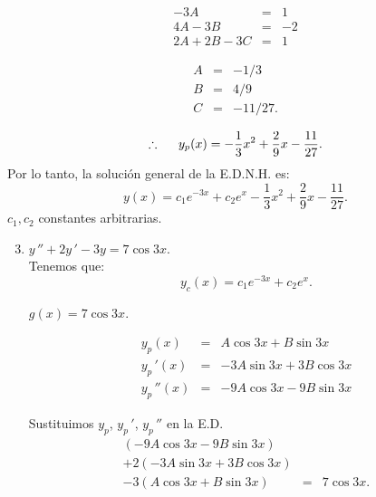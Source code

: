 \documentclass[9pt]{beamer}
\begin{document}
\begin{frame}[t]
	\begin{exampleblock}{}
		\begin{minipage}{0.5\linewidth}
			\[
				\begin{array}{rcl}
					-3A & = & 1 \\[2mm]
					4A -3B & = & -2 \\[2mm]
					2A+2B-3C & = & 1
				\end{array}
			\]
		\end{minipage}
		\begin{minipage}{0.4\linewidth}
			\[
				\begin{array}{rcl}
					A & = & -1/3 \\[2mm]
					B & = & 4/9 \\[2mm]
					C & = & -11/27.
				\end{array}
			\]
		\end{minipage}
		\[
			\therefore \hspace{5mm} y_p(x) = - \dfrac{1}{3} x^2+ \dfrac{2}{9} x- \dfrac{11}{27}.
		\]
		Por lo tanto, la solución general de la E.D.N.H. es:
		\[
			y(x) = c_1e^{-3x} + c_2e^x - \dfrac{1}{3} x^2+ \dfrac{2}{9} x- \dfrac{11}{27}.
		\]
		\(c_1,c_2\) constantes arbitrarias.
	\end{exampleblock}
\end{frame}

\begin{frame}[t]
	\begin{exampleblock}{}
		\begin{enumerate}
			\setcounter{enumi}{2}
		\item \(y\,'' +2y\,' -3y = 7 \cos 3x\). \\[2mm]
			Tenemos que:
				\[
					y_c(x) = c_1e^{-3x} + c_2e^x.
				\]
				\begin{minipage}{0.3\linewidth}
					\(g(x) = 7 \cos 3x\).
				\end{minipage}\hspace{5mm}
				\begin{minipage}{0.6\linewidth}
					\[
						\begin{array}{rcl}
							y_p(x) & = & A \cos 3x + B \sin 3x \\[2mm]
							y_p\,' (x) & = & -3A \sin 3x +3B \cos 3x \\[2mm]
							y_p\,'' (x) & = & -9A \cos 3x - 9B \sin 3x
						\end{array}
					\]
				\end{minipage}
				Sustituimos \(y_p\), \(y_p\,'\), \(y_p\,''\) en la E.D.
				\[
					\begin{array}{rcl}
						(-9A \cos 3x-9B \sin 3x) && \\[2mm]
						+2(-3A \sin 3x+3B \cos 3x)&& \\[2mm]
						-3(A \cos 3x + B \sin 3x) & = & 7 \cos 3x. \\[2mm]
					\end{array}
				\]
		\end{enumerate}
	\end{exampleblock}
\end{frame}
\end{document}

